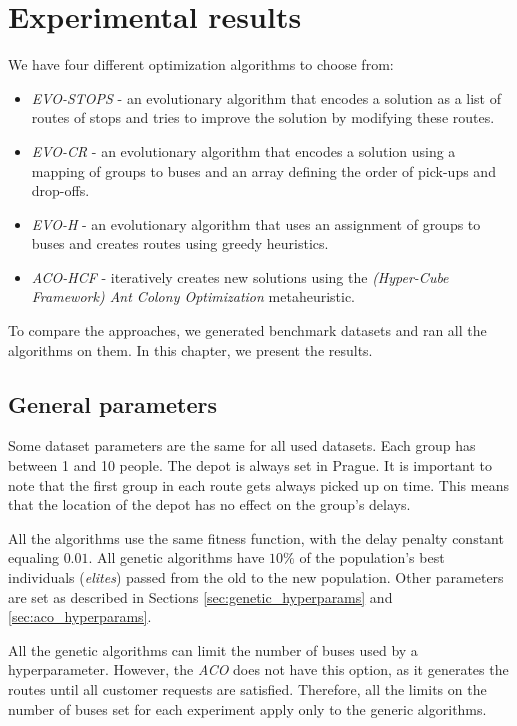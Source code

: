 \chapter{Experimental results}\label{ch:experiments}

We have four different optimization algorithms to choose from:
\begin{itemize}
    \item \textit{EVO-STOPS} - an evolutionary algorithm that encodes a solution as a list of routes of stops and tries to improve the solution by modifying these routes.
    \item \textit{EVO-CR} - an evolutionary algorithm that encodes a solution using a mapping of groups to buses and an array defining the order of pick-ups and drop-offs.
    \item \textit{EVO-H} - an evolutionary algorithm that uses an assignment of groups to buses and creates routes using greedy heuristics.
    \item \textit{ACO-HCF} - iteratively creates new solutions using the \textit{(Hyper-Cube Framework) Ant Colony Optimization} metaheuristic.
\end{itemize}

To compare the approaches, we generated benchmark datasets and ran all the algorithms on them. In this chapter, we present the results.

\section{General parameters}

Some dataset parameters are the same for all used datasets. Each group has between 1 and 10 people. The depot is always set in Prague. It is important to note that the first group in each route gets always picked up on time. This means that the location of the depot has no effect on the group's delays.

All the algorithms use the same fitness function, with the delay penalty constant equaling $0.01$. All genetic algorithms have $10\%$ of the population's best individuals (\textit{elites}) passed from the old to the new population. Other parameters are set as described in Sections \ref{sec:genetic_hyperparams} and \ref{sec:aco_hyperparams}.

All the genetic algorithms can limit the number of buses used by a hyperparameter. However, the \textit{ACO} does not have this option, as it generates the routes until all customer requests are satisfied. Therefore, all the limits on the number of buses set for each experiment apply only to the generic algorithms.

